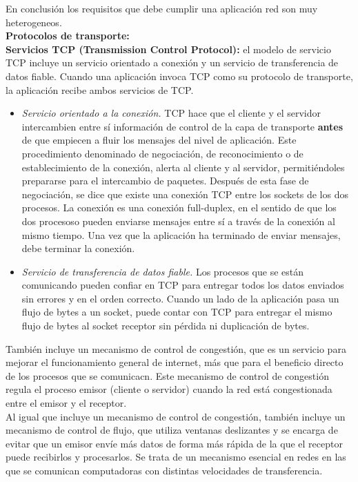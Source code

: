 \documentclass[a4paper,11pt]{article}
\begin{document}
En conclusión los requisitos que debe cumplir una aplicación red son muy heterogeneos. \\

\textbf{Protocolos de transporte:} \\

\textbf{Servicios TCP (Transmission Control Protocol):} el modelo de servicio TCP incluye un servicio orientado a conexión y un servicio de transferencia de datos fiable. Cuando una aplicación invoca TCP como su protocolo de transporte, la aplicación recibe ambos servicios de TCP.

\begin{itemize}
\item \textit{Servicio orientado a la conexión.} TCP hace que el cliente y el servidor intercambien entre sí información de control de la capa de transporte \textbf{antes} de que empiecen a fluir los mensajes del nivel de aplicación. Este procedimiento denominado de negociación, de reconocimiento o de establecimiento de la conexión, alerta al cliente y al servidor, permitiéndoles prepararse para el intercambio de paquetes. Después de esta fase de negociación, se dice que existe una conexión TCP entre los sockets de los dos procesos. La conexión es una conexión full-duplex, en el sentido de que los dos procesoso pueden enviarse mensajes entre sí a través de la conexión al mismo tiempo. Una vez que la aplicación ha terminado de enviar mensajes, debe terminar la conexión.

\item \textit{Servicio de transferencia de datos fiable.} Los procesos que se están comunicando pueden confiar en TCP para entregar todos los datos enviados sin errores y en el orden correcto. Cuando un lado de la aplicación pasa un flujo de bytes a un socket, puede contar con TCP para entregar el mismo flujo de bytes al socket receptor sin pérdida ni duplicación de bytes.
\end{itemize}

También incluye un mecanismo de control de congestión, que es un servicio para mejorar el funcionamiento general de internet, más que para el beneficio directo de los procesos que se comunicacn. Este mecanismo de control de congestión regula el proceso emisor (cliente o servidor) cuando la red está congestionada entre el emisor y el receptor.\\

Al igual que incluye un mecanismo de control de congestión, también incluye un mecanismo de control de flujo, que utiliza ventanas deslizantes y se encarga de evitar que un emisor envíe más datos de forma más rápida de la que el receptor puede recibirlos y procesarlos. Se trata de un mecanismo esencial en redes en las que se comunican computadoras con distintas velocidades de transferencia. \\
\end{document}
